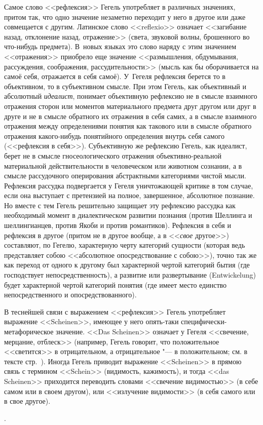 {Самое слово <<рефлексия>> Гегель употребляет в различных значениях, притом
так, что одно значение незаметно переходит у него в другое или даже
совмещается с другим. Латинское слово <<reflexio>> означает <<загибание назад,
отклонение назад, отражение>> (света, звуковой волны, брошенного во
что-нибудь предмета). В~новых языках это слово наряду с этим значением
<<отражения>> приобрело еще значение <<размышления, обдумывания, рассуждения,
соображения, рассудительности>> (мысль как бы оборачивается на самоё себя,
отражается в себя самоё). У~Гегеля рефлексия берется то в объективном, то в
субъективном смысле. При этом Гегель, как объективный и абсолютный
{\em идеалист}, понимает объективную рефлексию не в смысле взаимного
отражения сторон или моментов материального предмета друг другом или друг в
друге и не в смысле обратного их отражения в себя самих, а в смысле
взаимного отражения между определениями понятия как такового или в смысле
обратного отражения какого-нибудь понятийного определения внутрь себя
самого (<<рефлексия в себя>>). Субъективную же рефлексию Гегель, как
идеалист, берет не в смысле гносеологического отражения объективно-реальной
материальной действительности в человеческом или животном сознании, а в
смысле рассудочного оперирования абстрактными категориями чистой мысли.
Рефлексия рассудка подвергается у Гегеля уничтожающей критике в том случае,
если она выступает с претензией на полное, завершенное, абсолютное
познание. Но вместе с тем Гегель решительно защищает эту рефлексию рассудка
как необходимый момент в диалектическом развитии познания (против Шеллинга
и шеллингианцев, против Якоби и против романтиков). Рефлексия в себя и
рефлексия в другое (притом не в другое вообще, а в <<{\em свое} другое>>)
составляют, по Гегелю, характерную черту категорий сущности (которая ведь
представляет собою <<абсолютное опосредствование с собою>>), точно так же как
переход от одного к другому был характерной чертой категорий бытия (где
господствует непосредственность), а развитие или развертывание
(Entwickelung) будет характерной чертой категорий понятия (где имеет место
единство непосредственного и опосредствованного).

В теснейшей связи с выражением <<рефлексия>> Гегель употребляет выражение
<<Scheinen>>, имеющее у него опять-таки специфически-метафорическое значение.
<<Das Scheinen>> означает у Гегеля <<свечение, мерцание, отблеск>> (например,
Гегель говорит, что положительное <<светится>> в отрицательном, а
отрицательное "--- в положительном; см. в тексте стр.~\pageref{scheinen}).
Иногда Гегель приводит выражение <<Scheinen>> в прямою связь с термином
<<Schein>> (видимость, кажимость), и тогда <<das Scheinen>> приходится
переводить словами <<свечение видимостью>> (в себе самом или в своем другом),
или <<излучение видимости>> (в себя самого или в свое другое).}.
